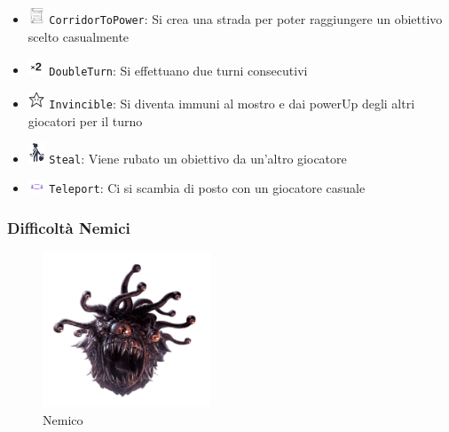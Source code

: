 \documentclass[a4paper,12pt]{report}
\begin{document}
\begin{itemize}
	\item \includegraphics[width=0.5cm]{img/PowerUps/CorridorToPower.png} \texttt{CorridorToPower}: Si crea una strada per poter raggiungere un obiettivo scelto casualmente
	\item \includegraphics[width=0.5cm]{img/PowerUps/Double.png} \texttt{DoubleTurn}: Si effettuano due turni consecutivi
	\item \includegraphics[width=0.5cm]{img/PowerUps/Invincible.png} \texttt{Invincible}: Si diventa immuni al mostro e dai powerUp degli altri giocatori per il turno
	\item \includegraphics[width=0.5cm]{img/PowerUps/Steal.png} \texttt{Steal}: Viene rubato un obiettivo da un'altro giocatore
	\item \includegraphics[width=0.5cm]{img/PowerUps/Teleport.png} \texttt{Teleport}: Ci si scambia di posto con un giocatore casuale
\end{itemize}

\subsubsection*{Difficoltà Nemici}

\begin{figure}[H]
	\centering
	\includegraphics[width=5cm]{img/Nemico.png}
	\caption{Nemico}
	\label{img:Nemico}
\end{figure}
\end{document}
